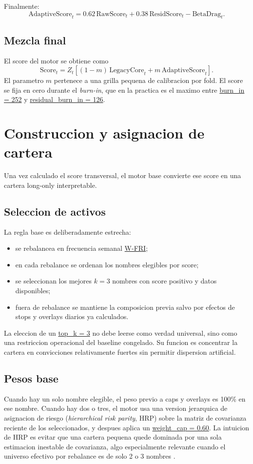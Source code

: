 \documentclass[11pt,letterpaper]{article}
\newcommand{\code}[1]{{\urlstyle{tt}\url{#1}}}
\begin{document}
Finalmente:
\begin{equation}
\mathrm{AdaptiveScore}_t
= 0.62\,\mathrm{RawScore}_t
 + 0.38\,\mathrm{ResidScore}_t
 - \mathrm{BetaDrag}_t.
\end{equation}

\subsection{Mezcla final}
El score del motor se obtiene como
\begin{equation}
\mathrm{Score}_t
= Z_t\!\left[
(1-m)\,\mathrm{LegacyCore}_t + m\,\mathrm{AdaptiveScore}_t
\right].
\end{equation}
El parametro \(m\) pertenece a una grilla pequena de calibracion por fold. El score se fija en cero durante el \emph{burn-in}, que en la practica es el maximo entre \code{burn_in = 252} y \code{residual_burn_in = 126}.

\section{Construccion y asignacion de cartera}
Una vez calculado el score transversal, el motor base convierte ese score en una cartera long-only interpretable.

\subsection{Seleccion de activos}
La regla base es deliberadamente estrecha:
\begin{itemize}
    \item se rebalancea en frecuencia semanal \code{W-FRI};
    \item en cada rebalance se ordenan los nombres elegibles por score;
    \item se seleccionan los mejores \(k=3\) nombres con score positivo y datos disponibles;
    \item fuera de rebalance se mantiene la composicion previa salvo por efectos de stops y overlays diarios ya calculados.
\end{itemize}

La eleccion de un \code{top\_k = 3} no debe leerse como verdad universal, sino como una restriccion operacional del baseline congelado. Su funcion es concentrar la cartera en convicciones relativamente fuertes sin permitir dispersion artificial.

\subsection{Pesos base}
Cuando hay un solo nombre elegible, el peso previo a caps y overlays es 100\% en ese nombre. Cuando hay dos o tres, el motor usa una version jerarquica de asignacion de riesgo (\emph{hierarchical risk parity}, HRP) sobre la matriz de covarianza reciente de los seleccionados, y despues aplica un \code{weight\_cap = 0.60}. La intuicion de HRP es evitar que una cartera pequena quede dominada por una sola estimacion inestable de covarianza, algo especialmente relevante cuando el universo efectivo por rebalance es de solo 2 o 3 nombres \citep{lopezdeprado2016}.
\end{document}
